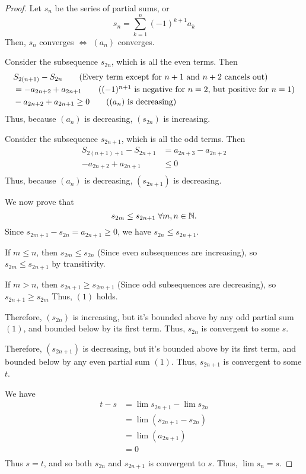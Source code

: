 \documentclass{article}
\begin{document}
\begin{proof}
Let $s_n$ be the series of partial sums, or \[s_n = \sum_{k=1}^n (-1)^{k+1} a_k 
\]
Then, $s_n$ converges $\iff$ $(a_n)$ converges.

Consider the subsequence $s_{2n}$, which is all the even terms.
Then \begin{align*}
    &S_{2(n+1)} - S_{2n} \tag{Every term except for $n+1$ and $n+2$ cancels out} \\ &= -a_{2n+2} + a_{2n+1} \tag{$(-1)^{n+1}$ is negative for $n=2$, but positive for $n=1$}\\
    &-a_{2n+2} + a_{2n+1} \geq 0 \tag{$(a_n)$ is decreasing}\\
\end{align*}
Thus, because $(a_n)$ is decreasing, $(s_{2n})$ is increasing.

Consider the subsequence $s_{2n+1}$, which is all the odd terms.
Then \begin{align*}
    S_{2(n+1)+1} - S_{2n+1}  &= a_{2n+3} - a_{2n+2}\\ 
    -a_{2n+2} + a_{2n+1} &\leq 0 \tag{$(a_n)$ is decreasing}\\
\end{align*}
Thus, because $(a_n)$ is decreasing, $(s_{2n+1})$ is decreasing.

We now prove that \begin{equation}
s_{2m} \leq s_{2n+1} \;\forall m, n \in \mathbb{N}.\end{equation}
Since $s_{2m+1} - s_{2n} = a_{2n+1} \geq 0$, we have $s_{2n} \leq s_{2n+1}$.

If $m \leq n$, then $s_{2m} \leq s_{2n}$ (Since even subsequences are increasing), so $s_{2m} \leq s_{2n+1}$ by transitivity.

If $m > n$, then $s_{2n+1} \geq s_{2m+1}$ (Since odd subsequences are decreasing), so $s_{2n+1} \geq s_{2m}$ Thus, $(1)$ holds.

Therefore, $(s_{2n})$ is increasing, but it's bounded above by any odd partial sum $(1)$, and bounded below by its first term. Thus, $s_{2n}$ is convergent to some $s$.

Therefore, $(s_{2n+1})$ is decreasing, but it's bounded above by its first term, and bounded below by any even partial sum $(1)$. Thus, $s_{2n+1}$ is convergent to some $t$.    

We have
\begin{align*}
    t - s &= \lim s_{2n+1} - \lim s_{2n}\\
    &= \lim (s_{2n+1} - s_{2n})\\
    &= \lim (a_{2n+1})\\
    &= 0 \tag{$\lim (a_n) = 0$ by def.}\\
\end{align*}
Thus $s = t$, and so both $s_{2n}$ and $s_{2n+1}$ is convergent to $s$. Thus, $\lim s_n = s$.

\end{proof}
\end{document}
